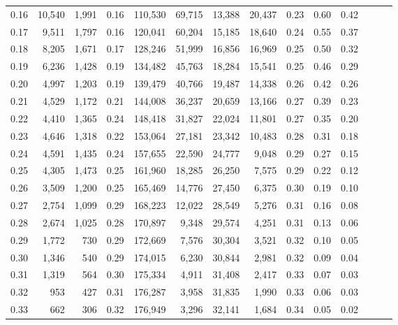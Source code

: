 \begin{tabular}{rrrrrrrrrrrrrr}
0.16 &  10,540 &  1,991 &  0.16 &  110,530 &   69,715 &  13,388 &  20,437 &  0.23 &  0.60 &      0.42 \\
0.17 &   9,511 &  1,797 &  0.16 &  120,041 &   60,204 &  15,185 &  18,640 &  0.24 &  0.55 &      0.37 \\
0.18 &   8,205 &  1,671 &  0.17 &  128,246 &   51,999 &  16,856 &  16,969 &  0.25 &  0.50 &      0.32 \\
0.19 &   6,236 &  1,428 &  0.19 &  134,482 &   45,763 &  18,284 &  15,541 &  0.25 &  0.46 &      0.29 \\
0.20 &   4,997 &  1,203 &  0.19 &  139,479 &   40,766 &  19,487 &  14,338 &  0.26 &  0.42 &      0.26 \\
0.21 &   4,529 &  1,172 &  0.21 &  144,008 &   36,237 &  20,659 &  13,166 &  0.27 &  0.39 &      0.23 \\
0.22 &   4,410 &  1,365 &  0.24 &  148,418 &   31,827 &  22,024 &  11,801 &  0.27 &  0.35 &      0.20 \\
0.23 &   4,646 &  1,318 &  0.22 &  153,064 &   27,181 &  23,342 &  10,483 &  0.28 &  0.31 &      0.18 \\
0.24 &   4,591 &  1,435 &  0.24 &  157,655 &   22,590 &  24,777 &   9,048 &  0.29 &  0.27 &      0.15 \\
0.25 &   4,305 &  1,473 &  0.25 &  161,960 &   18,285 &  26,250 &   7,575 &  0.29 &  0.22 &      0.12 \\
0.26 &   3,509 &  1,200 &  0.25 &  165,469 &   14,776 &  27,450 &   6,375 &  0.30 &  0.19 &      0.10 \\
0.27 &   2,754 &  1,099 &  0.29 &  168,223 &   12,022 &  28,549 &   5,276 &  0.31 &  0.16 &      0.08 \\
0.28 &   2,674 &  1,025 &  0.28 &  170,897 &    9,348 &  29,574 &   4,251 &  0.31 &  0.13 &      0.06 \\
0.29 &   1,772 &    730 &  0.29 &  172,669 &    7,576 &  30,304 &   3,521 &  0.32 &  0.10 &      0.05 \\
0.30 &   1,346 &    540 &  0.29 &  174,015 &    6,230 &  30,844 &   2,981 &  0.32 &  0.09 &      0.04 \\
0.31 &   1,319 &    564 &  0.30 &  175,334 &    4,911 &  31,408 &   2,417 &  0.33 &  0.07 &      0.03 \\
0.32 &     953 &    427 &  0.31 &  176,287 &    3,958 &  31,835 &   1,990 &  0.33 &  0.06 &      0.03 \\
0.33 &     662 &    306 &  0.32 &  176,949 &    3,296 &  32,141 &   1,684 &  0.34 &  0.05 &      0.02 \\

\end{tabular}
